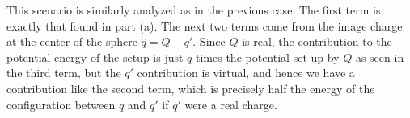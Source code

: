 {This scenario is similarly analyzed as in the previous case.
The first term is exactly that found in part (a).
The next two terms come from the image charge at the center of the sphere $\hat{q} = Q - q'$.
Since $Q$ is real, the contribution to the potential energy of the setup is just $q$ times the potential set up by $Q$ as seen in the third term, but the $q'$ contribution is virtual, and hence we have a contribution like the second term, which is precisely half the energy of the configuration between $q$ and $q'$ if $q'$ were a real charge.

}




